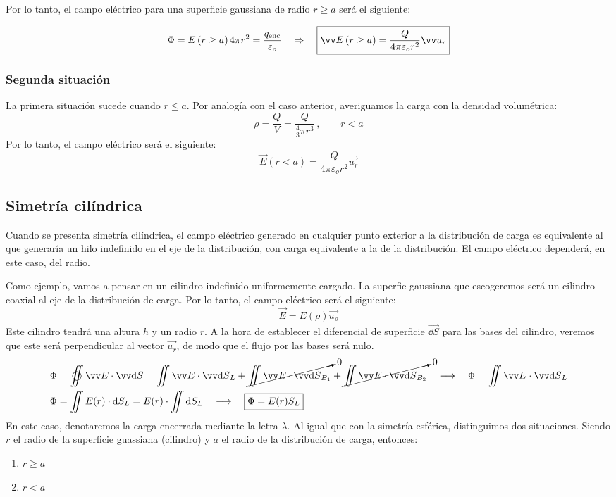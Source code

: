 \documentclass[a4paper]{book}
\begin{document}
Por lo tanto, el campo eléctrico para una superficie gaussiana de radio $r\geq a$ será el siguiente:

\[\Phi = E\left( r\geq a \right)4\pi r^2 =\frac{q\subtext{enc}}{\varepsilon_o} \quad \Rightarrow \quad \boxed{\vec{E}\left( r\geq a \right) = \frac{Q}{4\pi \varepsilon_o r^2}\vec{u_r}}\]


\subsubsection{Segunda situación}
La primera situación sucede cuando $r\leq a$. Por analogía con el caso anterior, averiguamos la carga con la densidad volumétrica:
\[\rho = \frac{Q}{V} = \frac{Q}{\frac{4}{3}\pi r^3} \, , \qquad r<a\]
Por lo tanto, el campo eléctrico será el siguiente:
\[\boxed{\vec{E}\left( r<a \right) = \frac{Q}{4\pi \varepsilon_o r^2}\vec{u_r}}\]


\subsection{Simetría cilíndrica}
Cuando se presenta simetría cilíndrica, el campo eléctrico generado en cualquier punto exterior a la distribución de carga es equivalente al que generaría un hilo indefinido en el eje de la distribución, con carga equivalente a la de la distribución. El campo eléctrico dependerá, en este caso, del radio.

Como ejemplo, vamos a pensar en un cilindro indefinido uniformemente cargado. La superfie gaussiana que escogeremos será un cilindro coaxial al eje de la distribución de carga. Por lo tanto, el campo eléctrico será el siguiente:
\[\vec{E}=E(\rho)\vec{u_\rho}\]
Este cilindro tendrá una altura $h$ y un radio $r$. A la hora de establecer el diferencial de superficie $\vec{\dd S}$ para las bases del cilindro, veremos que este será perpendicular al vector $\vec{u_r}$, de modo que el flujo por las bases será nulo.
\begin{align*}
	\Phi & = \varoiint \vec{E}\cdot \vec{\dd S} = \iint \vec{E}\cdot \vec{\dd S}_L + \cancelto{0}{\iint \vec{E}\cdot \vec{\dd S}_{B_1}} + \cancelto{0}{\iint \vec{E}\cdot \vec{\dd S}_{B_2}} \quad \longrightarrow \quad \Phi = \iint \vec{E}\cdot \vec{\dd S}_L \\
	\Phi & = \iint E(r)\cdot \dd S_L = E(r) \cdot \iint \dd S_L \quad \longrightarrow \quad \boxed{\Phi = E(r) S_L}
\end{align*}
En este caso, denotaremos la carga encerrada mediante la letra $\lambda$. Al igual que con la simetría esférica, distinguimos dos situaciones. Siendo $r$ el radio de la superficie guassiana (cilindro) y $a$ el radio de la distribución de carga, entonces:
\begin{enumerate}
	\item $r\geq a$
	\item $r<a$
\end{enumerate}
\end{document}
